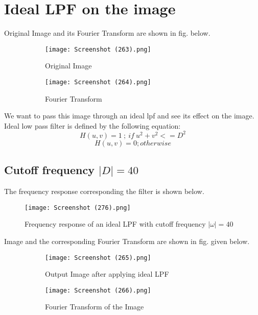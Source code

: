 \documentclass[12pt, a4paper]{article}
\begin{document}
\vspace*{-22pt}
\section{Ideal LPF on the image}
Original Image and its Fourier Transform are shown in fig. below.\\
\begin{figure}[H]
  \centering
  \begin{subfigure}[b]{0.37\linewidth}
    \texttt{[image: Screenshot (263).png]}
    \caption{Original Image}
  \end{subfigure}
  \begin{subfigure}[b]{0.37\linewidth}
    \texttt{[image: Screenshot (264).png]}
    \caption{Fourier Transform}
  \end{subfigure}
  \caption{}
  \label{fig:1}
\end{figure}

We want to pass this image through an ideal lpf and see its effect on the image. Ideal low pass filter is defined by the following equation:
\begin{equation*}
    H(u, v) = 1  \ ;\  if \ u^2 + v^2 <= D^2
\end{equation*}
\begin{equation*}
     H(u, v) = 0  ; otherwise
\end{equation*}
\subsection{Cutoff frequency $|D|=40$}
The frequency response corresponding the filter is shown below.
\begin{figure}[h!]
  \centering
    \texttt{[image: Screenshot (276).png]}
    \caption{Frequency response of an ideal LPF with cutoff frequency $|\omega|=40$}
  \label{fig:2}
\end{figure}

\clearpage

Image and the corresponding Fourier Transform are shown in fig. given below.
\begin{figure}[H]
  \centering
  \begin{subfigure}[b]{0.37\linewidth}
    \texttt{[image: Screenshot (265).png]}
    \caption{Output Image after applying ideal LPF}
  \end{subfigure}
  \begin{subfigure}[b]{0.37\linewidth}
    \texttt{[image: Screenshot (266).png]}
    \caption{Fourier Transform of the Image}
  \end{subfigure}
  \caption{}
  \label{fig:3}
\end{figure}
\end{document}
